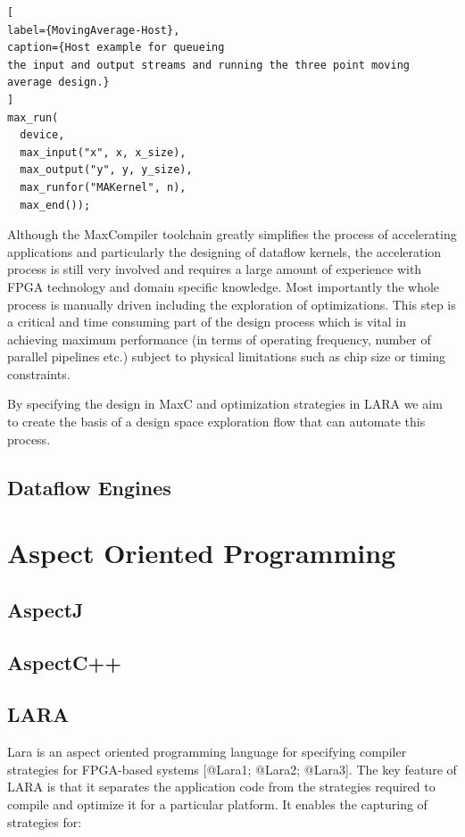 \begin{lstlisting}[
label={MovingAverage-Host},
caption={Host example for queueing
the input and output streams and running the three point moving
average design.}
]
max_run(
  device,
  max_input("x", x, x_size),
  max_output("y", y, y_size),
  max_runfor("MAKernel", n),
  max_end());
\end{lstlisting}


Although the MaxCompiler toolchain greatly simplifies the process of
accelerating applications and particularly the designing of dataflow
kernels, the acceleration process is still very involved and requires
a large amount of experience with FPGA technology and domain specific
knowledge. Most importantly the whole process is manually driven
including the exploration of optimizations. This step is a critical
and time consuming part of the design process which is vital in
achieving maximum performance (in terms of operating frequency, number
of parallel pipelines etc.) subject to physical limitations such as
chip size or timing constraints.

By specifying the design in MaxC and optimization strategies in LARA
we aim to create the basis of a design space exploration flow that can
automate this process.

\subsection{Dataflow Engines}

\section{Aspect Oriented Programming}

\subsection{AspectJ}

\subsection{AspectC++}

\subsection{LARA}

Lara is an aspect oriented programming language for specifying
compiler strategies for FPGA-based systems
[@Lara1; @Lara2; @Lara3]. The key feature of LARA is that it separates
the application code from the strategies required to compile and
optimize it for a particular platform. It enables the capturing of
strategies for:

